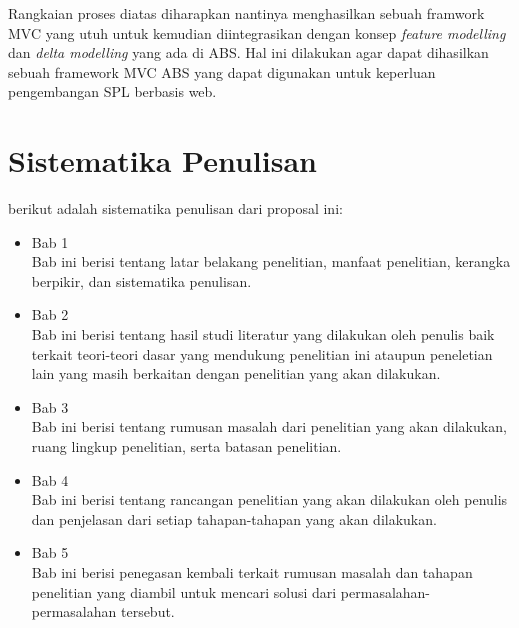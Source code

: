 \noindent
Rangkaian proses diatas diharapkan nantinya menghasilkan sebuah framwork MVC yang utuh untuk kemudian diintegrasikan dengan konsep \textit{feature modelling} dan \textit{delta modelling} yang ada di ABS. Hal ini dilakukan agar dapat dihasilkan sebuah framework MVC ABS yang dapat digunakan untuk keperluan pengembangan SPL berbasis web.

\section{Sistematika Penulisan}
berikut adalah sistematika penulisan dari proposal ini:
\begin{itemize}
    \item Bab 1 \babSatu \\
    Bab ini berisi tentang latar belakang penelitian, manfaat penelitian, kerangka berpikir, dan sistematika penulisan.
    \item Bab 2 \babDua \\
    Bab ini berisi tentang hasil studi literatur yang dilakukan oleh penulis baik terkait teori-teori dasar yang mendukung penelitian ini ataupun peneletian lain yang masih berkaitan dengan penelitian yang akan dilakukan.
    \item Bab 3 \babTiga \\
    Bab ini berisi tentang rumusan masalah dari penelitian yang akan dilakukan, ruang lingkup penelitian, serta batasan penelitian.
    \item Bab 4 \babEmpat \\
    Bab ini berisi tentang rancangan penelitian yang akan dilakukan oleh penulis dan penjelasan dari setiap tahapan-tahapan yang akan dilakukan.
    \item Bab 5 \babLima \\
    Bab ini berisi penegasan kembali terkait rumusan masalah dan tahapan penelitian yang diambil untuk mencari solusi dari permasalahan-permasalahan tersebut.
\end{itemize}